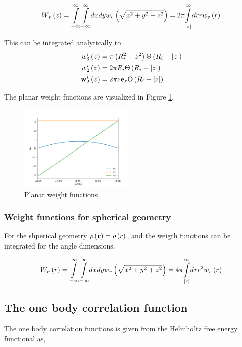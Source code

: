 \documentclass[12pt, letterpaper]{article}
\newcommand*{\abs}[1]{\lvert#1\rvert}
\newcommand*{\lb}{\ensuremath{\left(}}
\newcommand*{\rb}{\ensuremath{\right)}}
\begin{document}
\begin{equation}
  W_v \lb z \rb = \underset{-\infty}{\overset{\infty}{\int}} \underset{-\infty}{\overset{\infty}{\int}} dx dy w_v \lb \sqrt{x^2 + y^2 + z^2} \rb = 2 \pi \underset{\abs{z}}{\overset{\infty}{\int}} dr r  w_v \lb r \rb
\end{equation}

This can be integrated analytically to
\begin{align}
  w_3^i \lb z \rb &=  \pi \lb R_i^2 - z^2 \rb \Theta \lb R_i - \abs{z} \rb \\
  w_2^i \lb z \rb &=  2 \pi R_i \Theta \lb R_i - \abs{z} \rb \\
  \mathbf{w}_2^i \lb z \rb &= 2 \pi z \mathbf{e}_z  \Theta \lb R_i - \abs{z} \rb
\end{align}

The planar weight functions are visualized in Figure
\ref{fig:planar_weights}.
\begin{figure}[tbp]
  \centering
  \includegraphics[width=0.49\textwidth]{gfx/planar_weights}
  \caption{Planar weight functions.}
  \label{fig:planar_weights}
\end{figure}

\subsubsection{Weight functions for spherical geometry}

For the shperical geometry $\rho \lb \mathbf{r} \rb = \rho \lb r \rb $,
and the weigth functions can be integrated for the angle dimensions.

\begin{equation}
  W_v \lb r \rb = \underset{-\infty}{\overset{\infty}{\int}} \underset{-\infty}{\overset{\infty}{\int}} dx dy w_v \lb \sqrt{x^2 + y^2 + z^2} \rb = 4 \pi \underset{\abs{r}}{\overset{\infty}{\int}} dr r^2  w_v \lb r \rb
\end{equation}


\subsection{The one body correlation function}
The one body correlation functions is given from the Helmholtz free energy functional as,
\end{document}

